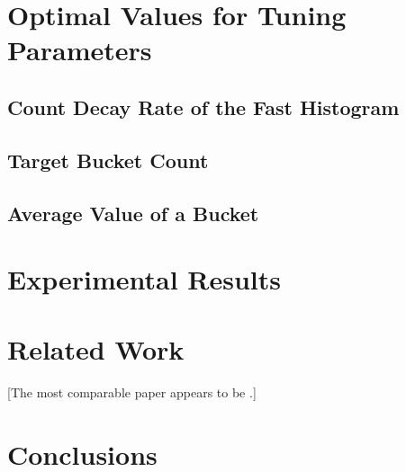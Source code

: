 \documentclass{sigkddExp}
\begin{document}
\section{Optimal Values for Tuning Parameters}
\label{sec:optimalTuningParameters}
\subsection{Count Decay Rate of the Fast Histogram}
\subsection{Target Bucket Count}
\subsection{Average Value of a Bucket}

\section{Experimental Results}

\section{Related Work}
    [The most comparable paper appears to be \cite{kifer2004detecting}.]

\section{Conclusions}



\end{document}
